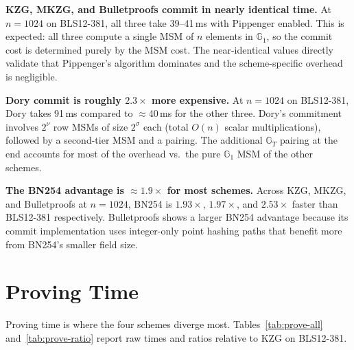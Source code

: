 \textbf{KZG, MKZG, and Bulletproofs commit in nearly identical time.}
At $n = 1024$ on BLS12-381, all three take 39--41\,ms with Pippenger
enabled. This is expected: all three compute a single MSM of $n$
elements in $\mathbb{G}_1$, so the commit cost is determined purely by
the MSM cost. The near-identical values directly validate that
Pippenger's algorithm dominates and the scheme-specific overhead is
negligible.

\textbf{Dory commit is roughly $2.3\times$ more expensive.} At
$n = 1024$ on BLS12-381, Dory takes 91\,ms compared to $\approx$40\,ms
for the other three. Dory's commitment involves $2^\nu$ row MSMs of
size $2^\sigma$ each (total $O(n)$ scalar multiplications), followed by
a second-tier MSM and a pairing. The additional $\mathbb{G}_T$ pairing
at the end accounts for most of the overhead vs.\ the pure
$\mathbb{G}_1$ MSM of the other schemes.

\textbf{The BN254 advantage is $\approx 1.9\times$ for most schemes.}
Across KZG, MKZG, and Bulletproofs at $n = 1024$, BN254 is
$1.93\times$, $1.97\times$, and $2.53\times$ faster than BLS12-381
respectively. Bulletproofs shows a larger BN254 advantage because its
commit implementation uses integer-only point hashing paths that
benefit more from BN254's smaller field size.

\section{Proving Time}
\label{sec:prove-comparison}

Proving time is where the four schemes diverge most.
Tables~\ref{tab:prove-all} and~\ref{tab:prove-ratio} report raw times
and ratios relative to KZG on BLS12-381.

